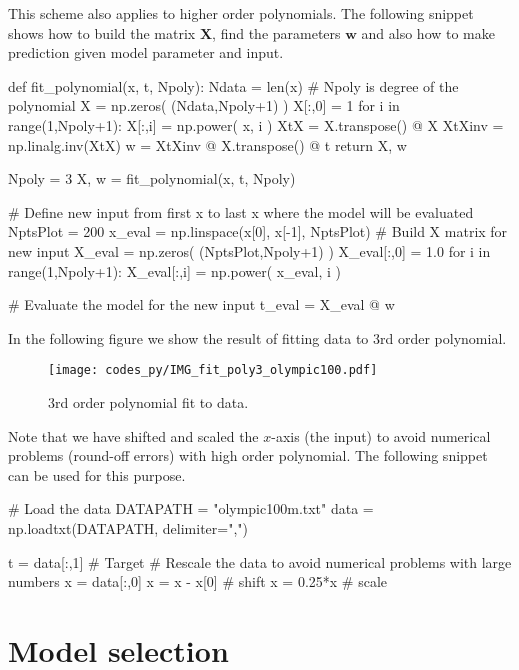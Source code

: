 This scheme also applies to higher order polynomials. The following snippet shows
how to build the matrix $\mathbf{X}$, find the parameters $\mathbf{w}$ and
also how to make prediction given model parameter and input.
\begin{pythoncode}
def fit_polynomial(x, t, Npoly):
    Ndata = len(x)
    # Npoly is degree of the polynomial
    X = np.zeros( (Ndata,Npoly+1) )
    X[:,0] = 1
    for i in range(1,Npoly+1):
        X[:,i] = np.power( x, i )
    XtX = X.transpose() @ X
    XtXinv = np.linalg.inv(XtX)
    w = XtXinv @ X.transpose() @ t
    return X, w

Npoly = 3
X, w = fit_polynomial(x, t, Npoly)

# Define new input from first x to last x where the model will be evaluated
NptsPlot = 200
x_eval = np.linspace(x[0], x[-1], NptsPlot)
# Build X matrix for new input
X_eval = np.zeros( (NptsPlot,Npoly+1) )
X_eval[:,0] = 1.0
for i in range(1,Npoly+1):
    X_eval[:,i] = np.power( x_eval, i )

# Evaluate the model for the new input  
t_eval = X_eval @ w
\end{pythoncode}

In the following figure we show the result of fitting  data
to 3rd order polynomial.
\begin{figure}[h]
\begin{center}
\texttt{[image: codes\_py/IMG\_fit\_poly3\_olympic100.pdf]}
\end{center}
\caption{3rd order polynomial fit to  data.}
\end{figure}

Note that we have shifted and scaled the $x$-axis (the input) to avoid
numerical problems (round-off errors) with high order polynomial.
The following snippet can be used for this purpose.
\begin{pythoncode}
# Load the data
DATAPATH = "olympic100m.txt"
data = np.loadtxt(DATAPATH, delimiter=",")

t = data[:,1] # Target
# Rescale the data to avoid numerical problems with large numbers
x = data[:,0]
x = x - x[0] # shift
x = 0.25*x # scale
\end{pythoncode}


\section{Model selection}


